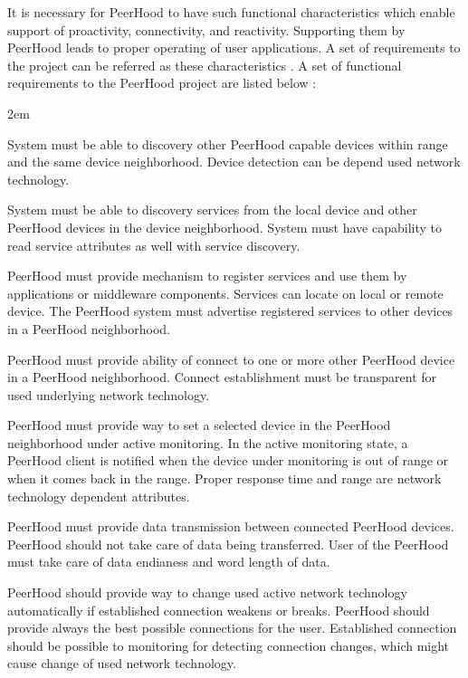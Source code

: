 %
It is necessary for PeerHood to have such functional characteristics which enable support of proactivity, connectivity, and reactivity. 
%
Supporting them by PeerHood leads to proper operating of user applications. 
%
A set of requirements to the project can be referred as these characteristics . 
%
A set of functional requirements to the PeerHood project are listed below  : 
\begin{description}
	\leftskip2em%
	\setlength{\itemsep}{0pt}%
	\setlength{\parsep}{0pt}%

	\item[Device discovery] System must be able to discovery other PeerHood capable devices within range and the same device neighborhood.
	Device detection can be depend used network technology.
		
	\item[Service discovery] System must be able to discovery services from the local device and other PeerHood devices in the device neighborhood.
	System must have capability to read service attributes as well with service discovery.

	\item[Service sharing] PeerHood must provide mechanism to register services and use them by applications or middleware components. 
	Services can locate on local or remote device. 
	The PeerHood system must advertise registered services to other devices in a PeerHood neighborhood.

	\item[Connection establishment] PeerHood must provide ability of connect to one or more other PeerHood device in a PeerHood neighborhood. 
	Connect establishment must be transparent for used underlying network technology.

	\item[Active monitoring of a device] PeerHood must provide way to set a selected device in the PeerHood neighborhood under active monitoring. 
	In the active monitoring state, a PeerHood client is notified when the device under monitoring is out of range or when it comes back in the range. 
	Proper response time and range are network technology dependent attributes.

	\item[Data transmission between devices] PeerHood must provide data transmission between connected PeerHood devices. 
	PeerHood should not take care of data being transferred. 
	User of the PeerHood must take care of data endianess and word length of data.

	\item[Seamless connectivity] PeerHood should provide way to change used active network technology automatically if established connection weakens or breaks. 
	PeerHood should provide always the best possible connections for the user. 
	Established connection should be possible to monitoring for detecting connection changes, which might cause change of used network technology.
\end{description}

